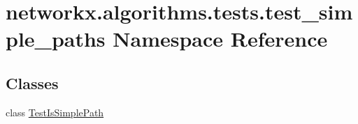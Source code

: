 \hypertarget{namespacenetworkx_1_1algorithms_1_1tests_1_1test__simple__paths}{}\section{networkx.\+algorithms.\+tests.\+test\+\_\+simple\+\_\+paths Namespace Reference}
\label{namespacenetworkx_1_1algorithms_1_1tests_1_1test__simple__paths}
\subsection*{Classes}
\begin{DoxyCompactItemize}
\item 
class \hyperlink{classnetworkx_1_1algorithms_1_1tests_1_1test__simple__paths_1_1TestIsSimplePath}{Test\+Is\+Simple\+Path}
\end{DoxyCompactItemize}
